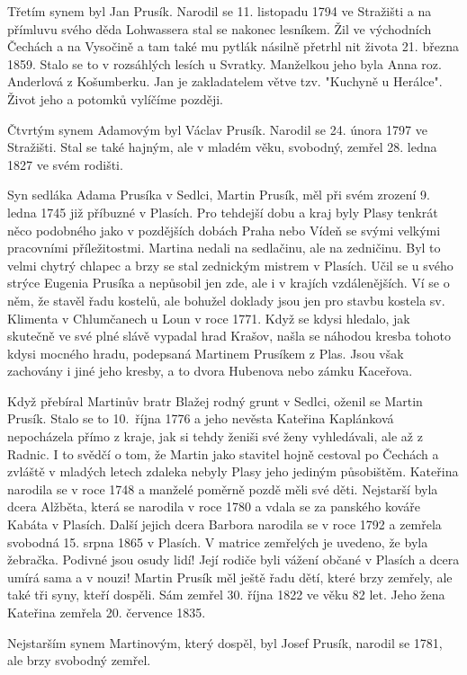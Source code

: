 \documentclass[../dejiny-rodu-prusiku.tex]{subfiles}
\begin{document}
Třetím synem byl Jan Prusík. Narodil se 11. listopadu 1794 ve Stražišti a na přímluvu své­ho děda Lohwassera stal se nakonec lesníkem. Žil ve východních Čechách a na Vysočině a tam také mu pytlák násilně přetrhl nit života 21. března 1859. Stalo se to v rozsáhlých lesích u Svratky. Manžel­kou jeho byla Anna roz. Anderlová z Košumberku. Jan je zakladatelem větve tzv. "Kuchyně u Herálce". Život jeho a potomků vylíčíme později.

Čtvrtým synem Adamovým byl Václav Prusík. Narodil se 24. února 1797 ve Stražišti. Stal se také hajným, ale v mladém věku, svobodný, zemřel 28. ledna 1827 ve svém rodišti.

Syn sedláka Adama Prusíka v Sedlci, Martin Prusík, měl při svém zrození 9. ledna 1745 již příbuzné v Plasích. Pro tehdejší dobu a kraj byly Plasy tenkrát něco podobného jako v pozdějších dobách Praha nebo Vídeň se svými velkými pracovními příležitostmi. Martina nedali na sedlačinu, ale na zedničinu. Byl to velmi chytrý chlapec a brzy se stal zednickým mistrem v Plasích. Učil se u svého strýce Eugenia Prusíka a nepůsobil jen zde, ale i v krajích vzdálenějších. Ví se o něm, že stavěl řadu kostelů, ale bohužel doklady jsou jen pro stavbu kostela sv. Klimenta v Chlumčanech u Loun v roce 1771. Když se kdysi hle­dalo, jak skutečně ve své plné slávě vypadal hrad Krašov, našla se náhodou kresba tohoto kdysi mocné­ho hradu, podepsaná Martinem Prusíkem z Plas. Jsou však zachovány i jiné jeho kresby, a to dvora Hubenova nebo zámku Kaceřova.

Když přebíral Martinův bratr Blažej rodný grunt v Sedlci, oženil se Martin Prusík. Stalo se to 10.~října 1776 a jeho nevěsta Kateřina Kaplánková nepocházela přímo z kraje, jak si tehdy ženiši své ženy vyhledá­vali, ale až z Radnic. I to svědčí o tom, že Martin jako stavitel hojně cestoval po Čechách a zvláště v mladých letech zdaleka nebyly Plasy jeho jediným působištěm. Kateřina narodila se v roce 1748 a manželé poměrně pozdě měli své děti. Nejstarší byla dcera Alžběta, která se narodila v roce 1780 a vdala se za panského kováře Kabáta v Plasích. Další jejich dcera Barbora narodila se v roce 1792 a zemřela svobodná 15. srpna 1865 v Plasích. V matrice zemřelých je uvede­no, že byla žebračka. Podivné jsou osudy lidí! Je­jí rodiče byli vážení občané v Plasích a dcera umírá sama a v nouzi! Martin Prusík měl ještě řadu dětí, které brzy zemřely, ale také tři syny, kteří dospěli. Sám zemřel 30. října 1822 ve věku 82 let. Jeho žena Kateřina zemřela 20. července 1835.

Nejstarším synem Martinovým, který dospěl, byl Josef Prusík, narodil se 1781, ale brzy svobodný zemřel.
\end{document}
